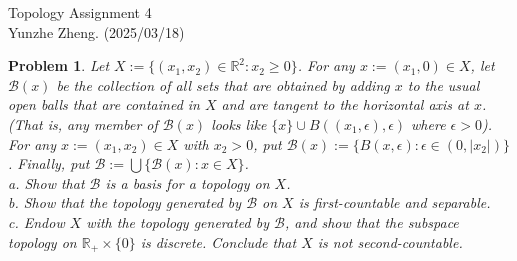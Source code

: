 \documentclass[12pt]{article}
\newtheorem{problem}{Problem}
\begin{document}
\noindent Topology \hfill Assignment 4\\
Yunzhe Zheng. (2025/03/18)

\hrulefill

\begin{problem}
Let $X:= \{(x_{1}, x_{2})\in\mathbb{R}^{2}: x_{2}\geq 0\}$. For any $x:=(x_{1}, 0)\in X$, let $\mathcal{B}(x)$ be the collection of all sets that are obtained by adding $x$ to the usual open balls that are contained in $X$ and are tangent to the horizontal axis at $x$. (That is, any member of $\mathcal{B}(x)$ looks like $\{x\}\cup B((x_{1},\epsilon),\epsilon)$ where $\epsilon>0$). For any $x:=(x_{1},x_{2})\in X$ with $x_{2}>0$, put $\mathcal{B}(x):=\{B(x,\epsilon): \epsilon\in(0,|x_{2}|)\}$. Finally, put $\mathcal{B}:=\bigcup\{\mathcal{B}(x): x\in X\}$. \\
\indent a. Show that $\mathcal{B}$ is a basis for a topology on $X$. \\
\indent b. Show that the topology generated by $\mathcal{B}$ on $X$ is first-countable and separable. \\
\indent c. Endow $X$ with the topology generated by $\mathcal{B}$, and show that the subspace topology on $\mathbb{R}_{+}\times \{0\}$ is discrete. Conclude that $X$ is not second-countable.
\end{problem}
\end{document}

